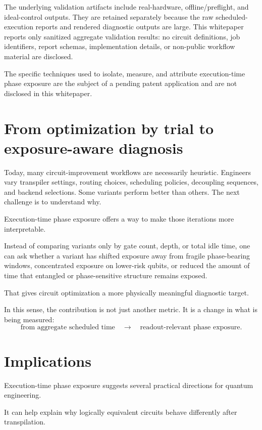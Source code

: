 \documentclass[11pt]{article}
\begin{document}
The underlying validation artifacts include real-hardware, offline/preflight, and ideal-control outputs. They are retained separately because the raw scheduled-execution reports and rendered diagnostic outputs are large. This whitepaper reports only sanitized aggregate validation results: no circuit definitions, job identifiers, report schemas, implementation details, or non-public workflow material are disclosed.

The specific techniques used to isolate, measure, and attribute execution-time phase exposure are the subject of a pending patent application and are not disclosed in this whitepaper.

\section*{From optimization by trial to exposure-aware diagnosis}

Today, many circuit-improvement workflows are necessarily heuristic. Engineers vary transpiler settings, routing choices, scheduling policies, decoupling sequences, and backend selections. Some variants perform better than others. The next challenge is to understand why.

Execution-time phase exposure offers a way to make those iterations more interpretable.

Instead of comparing variants only by gate count, depth, or total idle time, one can ask whether a variant has shifted exposure away from fragile phase-bearing windows, concentrated exposure on lower-risk qubits, or reduced the amount of time that entangled or phase-sensitive structure remains exposed.

That gives circuit optimization a more physically meaningful diagnostic target.

In this sense, the contribution is not just another metric. It is a change in what is being measured:
\[
\text{from aggregate scheduled time}
\quad\longrightarrow\quad
\text{readout-relevant phase exposure}.
\]

\section*{Implications}

Execution-time phase exposure suggests several practical directions for quantum engineering.

It can help explain why logically equivalent circuits behave differently after transpilation.
\end{document}
